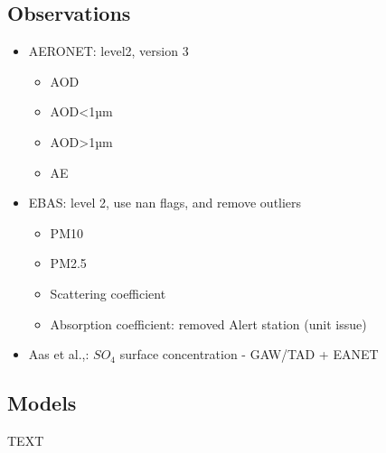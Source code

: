 \documentclass[journal abbreviation, manuscript]{copernicus}
\begin{document}
\subsection{Observations}
\begin{itemize}
 \item  AERONET: level2, version 3
       \begin{itemize}
        \item AOD
        \item AOD<1µm
        \item AOD>1µm
        \item AE
       \end{itemize}
 \item EBAS: level 2, use nan flags, and remove outliers
       \begin{itemize}
        \item PM10
        \item PM2.5
        \item Scattering coefficient
        \item Absorption coefficient: removed Alert station (unit issue)
       \end{itemize}
 \item Aas et al.,: $SO_{4}$ surface concentration - GAW/TAD + EANET
\end{itemize}

\subsection{Models}
TEXT
\end{document}
